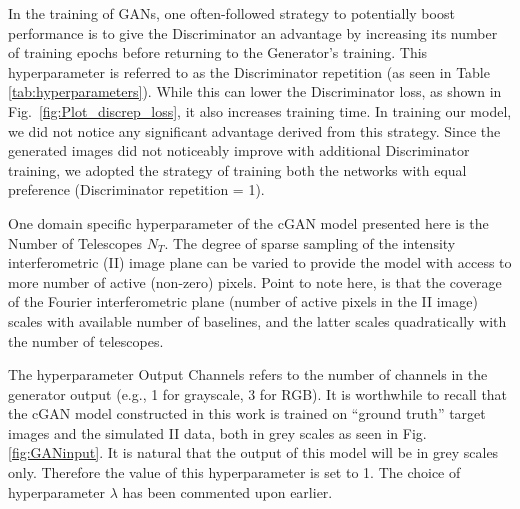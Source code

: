 In the training of GANs, one often-followed strategy to potentially boost performance is to give the Discriminator an advantage by increasing its number of training epochs before returning to the Generator's training. This hyperparameter is referred to as the Discriminator repetition (as seen in Table \ref{tab:hyperparameters}). While this can lower the Discriminator loss, as shown in Fig.~\ref{fig:Plot_discrep_loss}, it also increases training time. In training our model, we did not notice any significant advantage derived from this strategy. Since the generated images did not noticeably improve with additional Discriminator training, we adopted the strategy of training both the networks with equal preference (Discriminator repetition = 1).

One domain specific hyperparameter of the cGAN model presented here is the Number of Telescopes $N_T$. The degree of sparse sampling of the intensity interferometric (II) image plane can be varied to provide the model with access to more number of active (non-zero) pixels. Point to note here, is that the coverage of the Fourier interferometric plane (number of active pixels in the II image) scales with available number of baselines, and the latter scales quadratically with the number of telescopes.

The hyperparameter Output Channels refers to the number of channels in the generator output (e.g., 1 for grayscale, 3 for RGB). It is worthwhile to recall that the cGAN model constructed in this work is trained on ``ground truth'' target images and the simulated II data, both in grey scales as seen in Fig.\ref{fig:GANinput}. It is natural that the output of this model will be in grey scales only. Therefore the value of this hyperparameter is set to 1. The choice of hyperparameter \(\lambda\) has been commented upon earlier.

